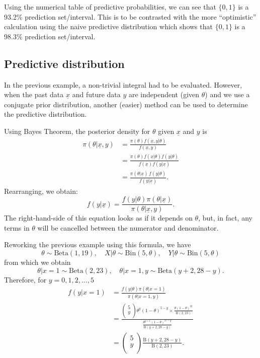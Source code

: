 Using the numerical table of predictive probabilities, we can see that
$\{0,1\}$ is a 93.2\% prediction set/interval. This is to be
contrasted with the more ``optimistic'' calculation using the naive
predictive distribution which shows that $\{0,1\}$ is a 98.3\%
prediction set/interval.

\clearpage

\subsection*{Predictive distribution}
In the previous example, a non-trivial integral had to be evaluated.
However, when the past data $\underline{x}$ and future data $y$ are
independent (given $\theta$) and we use a conjugate prior
distribution, another (easier) method can be used to determine the
predictive distribution.

Using Bayes Theorem, the posterior density for $\theta$ given
$\underline{x}$ and $y$ is
\begin{align*}
\pi(\theta|\underline{x},y)&=\frac{\pi(\theta)f(\underline{x},y|\theta)}{f(\underline{x},y)}\\
&=\frac{\pi(\theta)f(\underline{x}|\theta)f(y|\theta)}{f(\underline{x})f(y|\underline{x})}
\\
&=\frac{\pi(\theta|\underline{x})\,f(y|\theta)}{f(y|\underline{x})}.
\end{align*}
Rearranging, we obtain:
$$f(y|\underline{x}) =\frac{f(y|\theta)\pi(\theta|\underline{x})}{\pi(\theta|\underline{x},y)}.$$
The right-hand-side of this equation looks as if it depends on
$\theta$, but, in fact, any terms in $\theta$ will be cancelled
between the numerator and denominator.

Reworking the previous example using this formula, we have
$$
\theta\sim \mathrm{Beta}(1,19),\quad X|\theta\sim \mathrm{Bin}(5,\theta),\quad 
Y|\theta\sim \mathrm{Bin}(5,\theta)
$$
from which we obtain
$$
\theta|x=1\sim \mathrm{Beta}(2,23),\quad \theta|x=1,y\sim \mathrm{Beta}(y+2,28-y).
$$
Therefore, for $y=0,1,2,\ldots,5$
\begin{align*}
f(y|x=1)&=\frac{f(y|\theta)\pi(\theta|x=1)}{\pi(\theta|x=1,y)}\\
{}
&=\frac{\begin{pmatrix} 5 \\ y \\ \end{pmatrix} 
\theta^y(1-\theta)^{5-y}
\times \frac{\theta(1-\theta)^{22}}{\mathrm{B}(2,23)}}
{\frac{\theta^{y+1}(1-\theta)^{27-y}}{\mathrm{B}(y+2,28-y)}}\\ 
{}
&=\begin{pmatrix} 5 \\ y \\ \end{pmatrix} \frac{\mathrm{B}(y+2,28-y)}{\mathrm{B}(2,23)}.
\end{align*}

